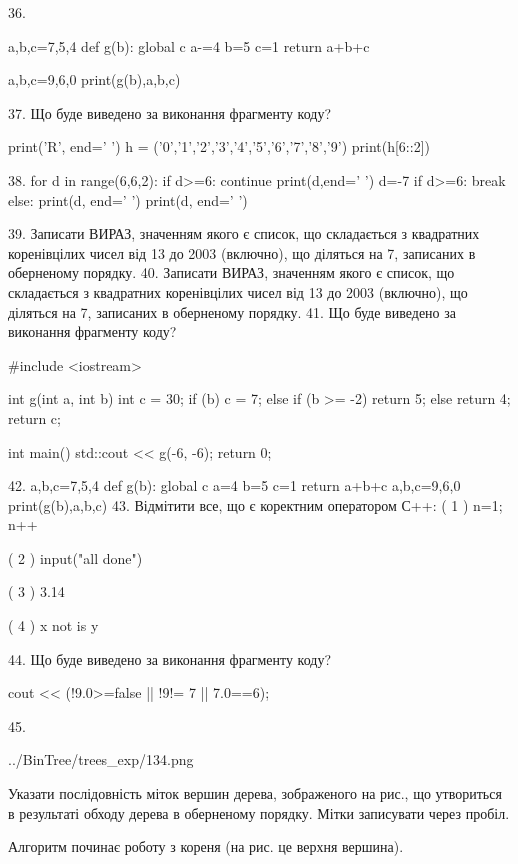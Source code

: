 \documentclass[11pt]{article}
\begin{document}
36. 

a,b,c=7,5,4
def g(b):
global c    a-=4
    b=5
    c=1
    return a+b+c

a,b,c=9,6,0
print(g(b),a,b,c)

37. Що буде виведено за виконання фрагменту коду?

print('R', end=' ')
h = ('0','1','2','3','4','5','6','7','8','9')
print(h[6::2])


38. 
for d in range(6,6,2):
    if d>=6:
        continue
        print(d,end=' ')
        d=-7
    if d>=6:
        break
else:
    print(d, end=' ')
print(d, end=' ')

39. 
Записати ВИРАЗ, значенням якого є список, що складається з квадратних коренівцілих чисел від 13 до 2003 (включно), що діляться на 7, записаних в оберненому порядку.
40. 
Записати ВИРАЗ, значенням якого є список, що складається з квадратних коренівцілих чисел від 13 до 2003 (включно), що діляться на 7, записаних в оберненому порядку.
41. Що буде виведено за виконання фрагменту коду?

#include <iostream>

int g(int a, int b){
    int c = 30;
    if (b)
        c = 7;
    else if (b >= -2)
         return 5;
    else 
        return 4;
    return c;
}

int main(){
    std::cout << g(-6, -6);
    return 0;
}

42. 
a,b,c=7,5,4
    def g(b):
      global c      a=4
      b=5
      c=1
      return a+b+c
    a,b,c=9,6,0
    print(g(b),a,b,c)
43. %
Відмітити все, що є коректним оператором С++:
( 1 ) n=1; n++

( 2 ) input("all done")

( 3 ) 3.14%

( 4 ) x not is y

44. Що буде виведено за виконання фрагменту коду?

cout << (!9.0>=false || !9!= 7 || 7.0==6);

45. 

\begin{center}
	{../BinTree/trees_exp/134.png}
\end{center}
Указати послідовність міток вершин дерева, зображеного на рис., що утвориться в результаті обходу дерева в оберненому порядку. Мітки записувати через пробіл.\par Алгоритм починає роботу з кореня (на рис. це верхня вершина).
\end{document}
